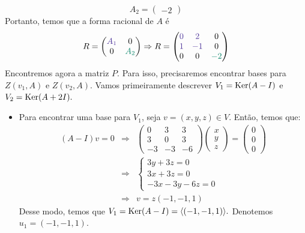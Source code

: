 \documentclass[11pt,a4paper]{article}
\begin{document}
{\[A_2 = \begin{pmatrix}
-2 \end{pmatrix}
\]
Portanto, temos que a forma racional de $A$ é
\[
R = \begin{pmatrix}
\textcolor{Violet}{A_1} & 0 \\ 0 & \textcolor{PineGreen}{A_2}
\end{pmatrix} \Rightarrow R = \begin{pmatrix}
\textcolor{Violet}{0} & \textcolor{Violet}{2} & 0 \\ \textcolor{Violet}{1} & \textcolor{Violet}{-1} & 0 \\
0 & 0 & \textcolor{PineGreen}{-2}
\end{pmatrix} 
\]
Encontremos agora a matriz $P.$ Para isso, precisaremos encontrar bases para $Z(v_1, A)$ e $Z(v_2, A).$ 
Vamos primeiramente descrever $V_1 = \operatorname{Ker}(A - I)$ e $V_2 = \operatorname{Ker}(A + 2I).$ 
\begin{itemize}
\item Para encontrar uma base para $V_1$, seja $v = (x, y, z) \in V.$ Então, temos que:
\[
\begin{array}{rcl}
(A - I)v = 0 &\Rightarrow& \begin{pmatrix}
0 & 3 & 3 \\
3 & 0 & 3 \\
-3 & -3 & -6
\end{pmatrix} \begin{pmatrix}
x \\ y \\ z
\end{pmatrix} = \begin{pmatrix}
0 \\ 0 \\ 0
\end{pmatrix} \\&\Rightarrow& \begin{cases}
3y + 3z = 0 \\
3x+3z = 0 \\
-3x-3y-6z = 0
\end{cases} \\&\Rightarrow& v = z (-1,-1,1)
\end{array}
\]
Desse modo, temos que $V_1 = \operatorname{Ker}(A - I) = \langle (-1,-1,1) \rangle.$ Denotemos $u_1 = (-1,-1,1).$


\end{itemize}}
\end{document}
